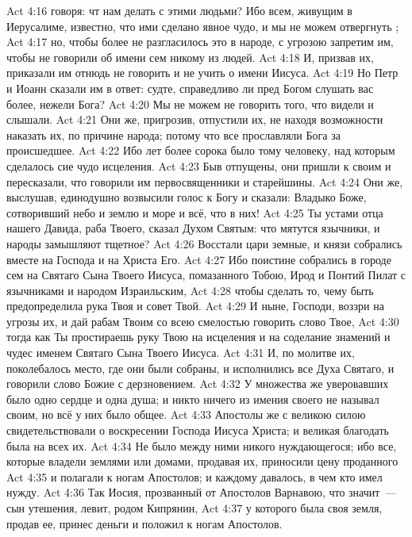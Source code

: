 \vs Act 4:16 говоря: чт нам делать с этими людьми? Ибо всем, живущим в Иерусалиме, известно, что ими сделано явное чудо, и мы не можем отвергнуть ;
\vs Act 4:17 но, чтобы более не разгласилось это в народе, с угрозою запретим им, чтобы не говорили об имени сем никому из людей.
\vs Act 4:18 И, призвав их, приказали им отнюдь не говорить и не учить о имени Иисуса.
\vs Act 4:19 Но Петр и Иоанн сказали им в ответ: судте, справедливо ли пред Богом слушать вас более, нежели Бога?
\vs Act 4:20 Мы не можем не говорить того, что видели и слышали.
\vs Act 4:21 Они же, пригрозив, отпустили их, не находя возможности наказать их, по причине народа; потому что все прославляли Бога за происшедшее.
\vs Act 4:22 Ибо лет более сорока было тому человеку, над которым сделалось сие чудо исцеления.
\rsbpar\vs Act 4:23 Быв отпущены, они пришли к своим и пересказали, что говорили им первосвященники и старейшины.
\vs Act 4:24 Они же, выслушав, единодушно возвысили голос к Богу и сказали: Владыко Боже, сотворивший небо и землю и море и всё, что в них!
\vs Act 4:25 Ты устами отца нашего Давида, раба Твоего, сказал Духом Святым: что мятутся язычники, и народы замышляют тщетное?
\vs Act 4:26 Восстали цари земные, и князи собрались вместе на Господа и на Христа Его.
\vs Act 4:27 Ибо поистине собрались в городе сем на Святаго Сына Твоего Иисуса, помазанного Тобою, Ирод и Понтий Пилат с язычниками и народом Израильским,
\vs Act 4:28 чтобы сделать то, чему быть предопределила рука Твоя и совет Твой.
\vs Act 4:29 И ныне, Господи, воззри на угрозы их, и дай рабам Твоим со всею смелостью говорить слово Твое,
\vs Act 4:30 тогда как Ты простираешь руку Твою на исцеления и на соделание знамений и чудес именем Святаго Сына Твоего Иисуса.
\vs Act 4:31 И, по молитве их, поколебалось место, где они были собраны, и исполнились все Духа Святаго, и говорили слово Божие с дерзновением.
\rsbpar\vs Act 4:32 У множества же уверовавших было одно сердце и одна душа; и никто ничего из имения своего не называл своим, но всё у них было общее.
\vs Act 4:33 Апостолы же с великою силою свидетельствовали о воскресении Господа Иисуса Христа; и великая благодать была на всех их.
\vs Act 4:34 Не было между ними никого нуждающегося; ибо все, которые владели землями или домами, продавая их, приносили цену проданного
\vs Act 4:35 и полагали к ногам Апостолов; и каждому давалось, в чем кто имел нужду.
\vs Act 4:36 Так Иосия, прозванный от Апостолов Варнавою, что значит~--- сын утешения, левит, родом Кипрянин,
\vs Act 4:37 у которого была своя земля, продав ее, принес деньги и положил к ногам Апостолов.
